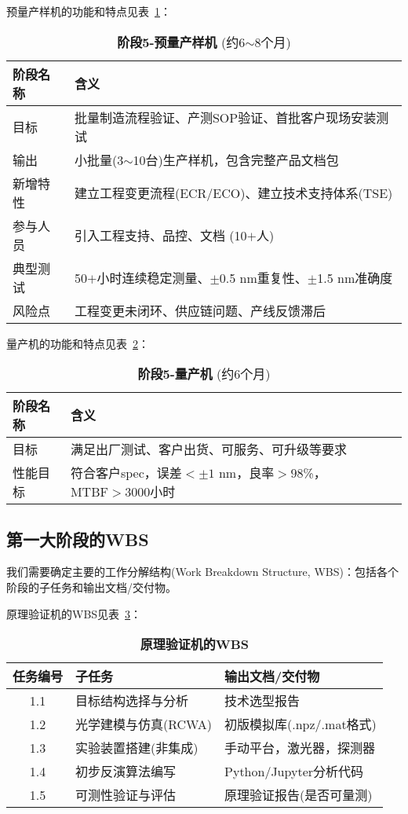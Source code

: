 预量产样机的功能和特点见表~\ref{table:pilot}：
\begin{table}[h!]
\centering
\caption{\textbf{阶段5-预量产样机} (约6$\sim$8个月)}
\label{table:pilot}
\begin{tabular}{l|l}
\hline\hline
\textbf{阶段名称} & \textbf{含义} \\ \hline
目标 & 批量制造流程验证、产测SOP验证、首批客户现场安装测试 \\ \hline
输出 & 小批量(3$\sim$10台)生产样机，包含完整产品文档包 \\ \hline
新增特性 & 建立工程变更流程(ECR/ECO)、建立技术支持体系(TSE) \\ \hline
参与人员 & 引入工程支持、品控、文档 (10$+$人)  \\ \hline
典型测试 & 50$+$小时连续稳定测量、$\pm$0.5 nm重复性、$\pm$1.5 nm准确度 \\ \hline
风险点 & 工程变更未闭环、供应链问题、产线反馈滞后 \\
\hline\hline
\end{tabular}
\end{table}

量产机的功能和特点见表~\ref{table:mp}：
\begin{table}[h!]
\centering
\caption{\textbf{阶段5-量产机} (约6个月)}
\label{table:mp}
\begin{tabular}{l|l}
\hline\hline
\textbf{阶段名称} & \textbf{含义} \\ \hline
目标 & 满足出厂测试、客户出货、可服务、可升级等要求 \\ \hline
性能目标 & 符合客户spec，误差$<\pm1$ nm，良率$>98$\%，$\text{MTBF}>3000$小时 \\
\hline\hline
\end{tabular}
\end{table}


\subsection{第一大阶段的WBS~\label{第一大阶段的WBS}}
我们需要确定主要的工作分解结构(Work Breakdown Structure, WBS)：包括各个阶段的子任务和输出文档/交付物。

原理验证机的WBS见表~\ref{table:POC_WBS}：
\begin{table}[h!]
\centering
\caption{\textbf{原理验证机的WBS}}
\label{table:POC_WBS}
\begin{tabular}{c|l|l}
\hline\hline
\textbf{任务编号} & \textbf{子任务} & \textbf{输出文档/交付物}  \\ \hline
1.1 & 目标结构选择与分析 & 技术选型报告 \\ \hline
1.2 & 光学建模与仿真(RCWA) & 初版模拟库(.npz/.mat格式) \\ \hline
1.3 & 实验装置搭建(非集成) & 手动平台，激光器，探测器 \\ \hline
1.4 & 初步反演算法编写 & Python/Jupyter分析代码 \\ \hline
1.5 & 可测性验证与评估 & 原理验证报告(是否可量测)\\
\hline\hline
\end{tabular}
\end{table}

